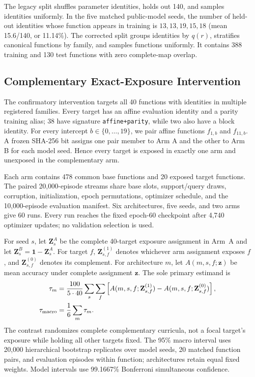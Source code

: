 The legacy split shuffles parameter identities, holds out 140, and samples
identities uniformly.  In the five matched public-model seeds, the number of
held-out identities whose function appears in training is
$13,13,19,15,18$ (mean 15.6/140, or 11.14\%).  The corrected split groups
identities by $q(r)$, stratifies canonical functions by family, and samples
functions uniformly.  It contains 388 training and 130 test functions with
zero complete-map overlap.

\subsection{Complementary Exact-Exposure Intervention}

The confirmatory intervention targets all 40 functions with identities in
multiple registered families.  Every target has an affine evaluation identity
and a parity training alias; 38 have signature
\texttt{affine+parity}, while two also have a block identity.  For every
intercept $b\in\{0,\ldots,19\}$, we pair affine functions $f_{1,b}$ and
$f_{11,b}$.  A frozen SHA-256 bit assigns one pair member to Arm A and the
other to Arm B for each model seed.  Hence every target is exposed in exactly
one arm and unexposed in the complementary arm.

Each arm contains 478 common base functions and 20 exposed target functions.
The paired 20,000-episode streams share base slots, support/query draws,
corruption, initialization, epoch permutations, optimizer schedule, and the
10,000-episode evaluation manifest.  Six architectures, five seeds, and two
arms give 60 runs.  Every run reaches the fixed epoch-60 checkpoint after
4,740 optimizer updates; no validation selection is used.

For seed $s$, let $\mathbf Z_s^A$ be the complete 40-target exposure
assignment in Arm~A and let
$\mathbf Z_s^B=\mathbf 1-\mathbf Z_s^A$.  For target $f$,
$\mathbf Z_{s,f}^{(1)}$ denotes whichever arm assignment exposes $f$, and
$\mathbf Z_{s,f}^{(0)}$ denotes its complement.  For architecture $m$, let
$A(m,s,f;\mathbf z)$ be mean accuracy under complete assignment $\mathbf z$.
The sole primary estimand is
\begin{align}
\tau_m
&=\frac{100}{5\cdot40}
\sum_s\sum_f
\left[
A(m,s,f;\mathbf Z_{s,f}^{(1)})
-A(m,s,f;\mathbf Z_{s,f}^{(0)})
\right],\\
\tau_{\rm macro}
&=\frac{1}{6}\sum_m\tau_m.
\end{align}
The contrast randomizes complete complementary curricula, not a focal
target's exposure while holding all other targets fixed.
The 95\% macro interval uses 20,000 hierarchical bootstrap replicates over
model seeds, 20 matched function pairs, and evaluation episodes within
function; architectures retain equal fixed weights.  Model intervals use
99.1667\% Bonferroni simultaneous confidence.

